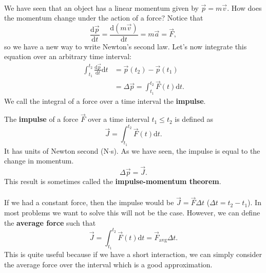 \documentclass[../newtonian_mechanics.tex]{subfiles}
\begin{document}
        \paragraph{}
        We have seen that an object has a linear momentum given by $\vec{p}=m\vec{v}$.
        How does the momentum change under the action of a force?
        Notice that
        \begin{equation}
            \frac{\mathrm{d}\vec{p}}{\mathrm{d}t}=\frac{\mathrm{d}(m\vec{v})}{\mathrm{d}t}=m\vec{a}=\vec{F},
        \end{equation}
        so we have a new way to write Newton's second law.
        Let's now integrate this equation over an arbitrary time interval:
        \begin{align}
            \int_{t_1}^{t_2}\frac{\mathrm{d}\vec{p}}{\mathrm{d}t}\mathrm{d}t &= \vec{p}(t_2) - \vec{p}(t_1) \\
            &= \Delta\vec{p} = \int_{t_1}^{t_2}\vec{F}(t)\mathrm{d}t.
        \end{align}
        We call the integral of a force over a time interval the \textbf{impulse}.
        \begin{definition}
            The \textbf{impulse} of a force $\vec{F}$ over a time interval $t_1\leq t_2$ is defined as
            \begin{equation}
                \vec{J}=\int_{t_1}^{t_2}\vec{F}(t)\mathrm{d}t.
            \end{equation}
            It has units of Newton second (N$\cdot$s). As we have seen, the impulse is equal to the change in momentum.
            \begin{equation}
                \Delta\vec{p}=\vec{J}.
            \end{equation}
            This result is sometimes called the \textbf{impulse-momentum theorem}.
        \end{definition}

        \paragraph{}
        If we had a constant force, then the impulse would be $\vec{J}=\vec{F}\Delta t$ ($\Delta t=t_2-t_1$).
        In most problems we want to solve this will not be the case. However, we can define the \textbf{average force} such that
        \begin{equation}
            \vec{J}=\int_{t_1}^{t_2}\vec{F}(t)\mathrm{d}t=\vec{F}_\text{avg}\Delta t.
        \end{equation}
        This is quite useful because if we have a short interaction, we can simply consider the average force over the interval which is a good approximation.
\end{document}
